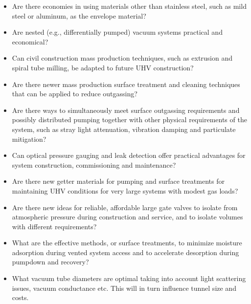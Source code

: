\begin{itemize}
\item  Are there economies in using materials other than stainless steel, such as mild steel or aluminum, as the envelope material? %
\item Are nested (e.g., differentially pumped) vacuum systems practical and economical? 

\item Can civil construction mass production techniques, such as extrusion and spiral tube milling, be adapted to future UHV construction?

\item Are there newer mass production surface treatment and cleaning techniques that can be applied to reduce outgassing? %

\item Are there ways to simultaneously meet surface outgassing requirements and possibly distributed pumping together with other physical requirements of the system, such as 
stray light attenuation, vibration damping and particulate mitigation?

\item Can optical pressure gauging and leak detection offer practical advantages for system construction, commissioning and maintenance?

\item Are there new getter materials for pumping and surface treatments for maintaining \ac{UHV} conditions for very large systems with modest gas loads?

\item Are there new ideas for reliable, affordable large gate valves to isolate from atmospheric pressure during construction and service, and to isolate volumes with different requirements?

\item What are the effective methods, or surface treatments, to minimize moisture adsorption during vented system access and to accelerate desorption during pumpdown and recovery?

\item What vacuum tube diameters are optimal taking into account light scattering issues, vacuum conductance etc. This will in turn influence tunnel size and costs.

\end{itemize}


